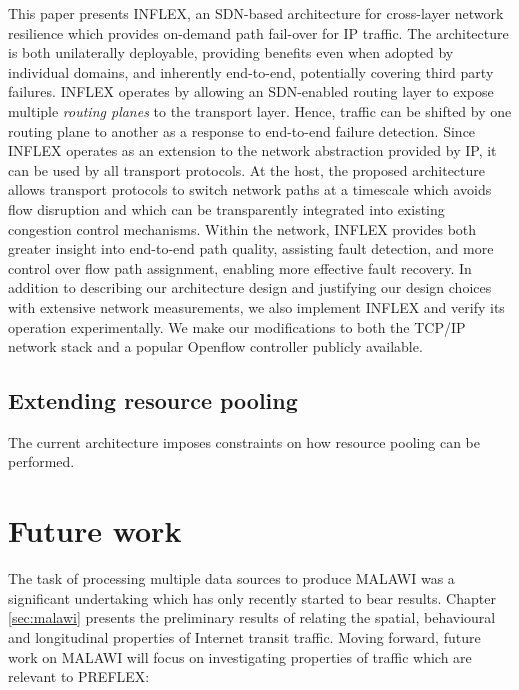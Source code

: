 {\COMMENT
This paper presents INFLEX, an \ac{SDN}-based architecture for cross-layer network resilience which provides on-demand path fail-over for \ac{IP} traffic. 
The architecture is both unilaterally deployable, providing benefits even when adopted by individual domains, and inherently end-to-end, potentially covering third party failures.
INFLEX operates by allowing an \ac{SDN}-enabled routing layer to expose multiple \emph{routing planes} to the transport layer. 
Hence, traffic can be shifted by one routing plane to another as a response to end-to-end failure detection.
Since INFLEX operates as an extension to the network abstraction provided by \ac{IP}, it can be used by all transport protocols.
At the host, the proposed architecture allows transport protocols to switch network paths at a timescale which avoids flow disruption and which can be transparently integrated into existing congestion control mechanisms.
Within the network, INFLEX provides both greater insight into end-to-end path quality, assisting fault detection, and more control over flow path assignment, enabling more effective fault recovery. 
In addition to describing our architecture design and justifying our design choices with extensive network measurements, we also implement INFLEX and verify its operation experimentally. 
We make our modifications to both the \ac{TCP}/\ac{IP} network stack and a popular Openflow controller \cite{pox} publicly available.
}



\subsection{Extending resource pooling}



The current architecture imposes constraints on how resource pooling can be performed.

\section{Future work}

The task of processing multiple data sources to produce \ac{MALAWI} was a significant undertaking which has only recently started to bear results.
Chapter \ref{sec:malawi} presents the preliminary results of relating the spatial, behavioural and longitudinal properties of Internet transit traffic.
Moving forward, future work on \ac{MALAWI} will focus on investigating properties of traffic which are relevant to \ac{PREFLEX}:

